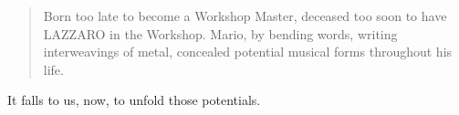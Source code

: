 \begin{quote}
  \begin{sf}
    \small
    Born too late to become a Workshop Master, deceased too soon to have 
    LAZZARO in the Workshop. Mario, by bending words, writing interweavings of 
    metal, concealed potential musical forms throughout his life. 
    \cite{silvi2025lazzaro}
  \end{sf}
\end{quote}

It falls to us, now, to unfold those potentials.



%
%

